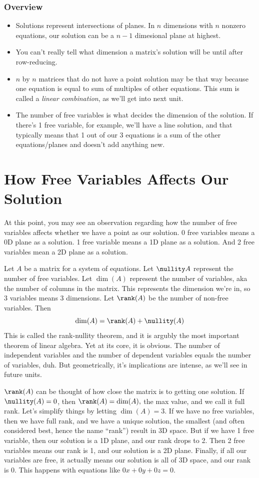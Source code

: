\documentclass[12pt]{scrartcl}
\begin{document}
\subsubsection*{Overview}
\begin{itemize}
    \item Solutions represent intersections of planes. In $n$ dimensions with $n$ nonzero equations, our solution can be a $n-1$ dimesional plane at highest.
    \item You can't really tell what dimension a matrix's solution will be until after row-reducing.
    \item $n$ by $n$ matrices that do not have a point solution may be that way because one equation is equal to sum of multiples of other equations. This sum is called a \textit{linear combination}, as we'll get into next unit.
    \item The number of free variables is what decides the dimension of the solution. If there's 1 free variable, for example, we'll have a line solution, and that typically means that 1 out of our 3 equations is a sum of the other equations/planes and doesn't add anything new.
\end{itemize}

\newpage
\section*{How Free Variables Affects Our Solution}
At this point, you may see an observation regarding how the number of free variables affects whether we have a point as our solution. 0 free variables means a 0D plane as a solution. 1 free variable means a 1D plane as a solution. And 2 free variables mean a 2D plane as a solution.

Let $A$ be a matrix for a system of equations. Let $\nullity A$ represent the number of free variables. Let $\dim(A)$ represent the number of variables, aka the number of columns in the matrix. This represents the dimension we're in, so 3 variables means 3 dimensions. Let $\rank(A)$ be the number of non-free variables. Then
\[\dim(A) = \rank(A) + \nullity(A)\]
This is called the rank-nullity theorem, and it is argubly the most important theorem of linear algebra. Yet at its core, it is obvious. The number of independent variables and the number of dependent variables equals the number of variables, duh. But geometrically, it's implications are intense, as we'll see in future units.

$\rank(A)$ can be thought of how close the matrix is to getting one solution. If $\nullity(A) = 0$, then $\rank(A) = \dim(A),$ the max value, and we call it full rank. Let's simplify things by letting $\dim(A) = 3.$ If we have no free variables, then we have full rank, and we have a unique solution, the smallest (and often considered best, hence the name ``rank'') result in 3D space.  But if we have 1 free variable, then our solution is a 1D plane, and our rank drops to 2. Then 2 free variables means our rank is 1, and our solution is a 2D plane. Finally, if all our variables are free, it actually means our solution is all of 3D space, and our rank is 0. This happens with equations like $0x + 0y + 0z = 0.$
\end{document}

